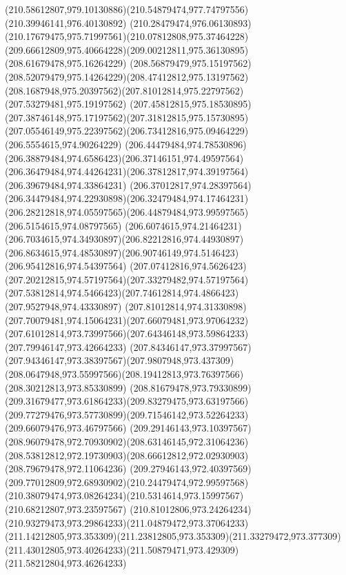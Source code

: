 {    \curveto(210.58612807,979.10130886)(210.54879474,977.74797556)(210.39946141,976.40130892)
    \curveto(210.28479474,976.06130893)(210.17679475,975.71997561)(210.07812808,975.37464228)
    \curveto(209.66612809,975.40664228)(209.00212811,975.36130895)(208.61679478,975.16264229)
    \curveto(208.56879479,975.15197562)(208.52079479,975.14264229)(208.47412812,975.13197562)
    \curveto(208.1687948,975.20397562)(207.81012814,975.22797562)(207.53279481,975.19197562)
    \curveto(207.45812815,975.18530895)(207.38746148,975.17197562)(207.31812815,975.15730895)
    \curveto(207.05546149,975.22397562)(206.73412816,975.09464229)(206.5554615,974.90264229)
    \curveto(206.44479484,974.78530896)(206.38879484,974.6586423)(206.37146151,974.49597564)
    \curveto(206.36479484,974.44264231)(206.37812817,974.39197564)(206.39679484,974.33864231)
    \curveto(206.37012817,974.28397564)(206.34479484,974.22930898)(206.32479484,974.17464231)
    \curveto(206.28212818,974.05597565)(206.44879484,973.99597565)(206.5154615,974.08797565)
    \curveto(206.6074615,974.21464231)(206.7034615,974.34930897)(206.82212816,974.44930897)
    \curveto(206.8634615,974.48530897)(206.90746149,974.5146423)(206.95412816,974.54397564)
    \curveto(207.07412816,974.5626423)(207.20212815,974.57197564)(207.33279482,974.57197564)
    \curveto(207.53812814,974.5466423)(207.74612814,974.4866423)(207.9527948,974.43330897)
    \curveto(207.81012814,974.31330898)(207.70079481,974.15064231)(207.66079481,973.97064232)
    \curveto(207.61012814,973.73997566)(207.64346148,973.59864233)(207.79946147,973.42664233)
    \curveto(207.84346147,973.37997567)(207.94346147,973.38397567)(207.9807948,973.437309)
    \curveto(208.0647948,973.55997566)(208.19412813,973.76397566)(208.30212813,973.85330899)
    \curveto(208.81679478,973.79330899)(209.31679477,973.61864233)(209.83279475,973.63197566)
    \curveto(209.77279476,973.57730899)(209.71546142,973.52264233)(209.66079476,973.46797566)
    \curveto(209.29146143,973.10397567)(208.96079478,972.70930902)(208.63146145,972.31064236)
    \curveto(208.53812812,972.19730903)(208.66612812,972.02930903)(208.79679478,972.11064236)
    \curveto(209.27946143,972.40397569)(209.77012809,972.68930902)(210.24479474,972.99597568)
    \curveto(210.38079474,973.08264234)(210.5314614,973.15997567)(210.68212807,973.23597567)
    \curveto(210.81012806,973.24264234)(210.93279473,973.29864233)(211.04879472,973.37064233)
    \curveto(211.14212805,973.353309)(211.23812805,973.353309)(211.33279472,973.377309)
    \curveto(211.43012805,973.40264233)(211.50879471,973.429309)(211.58212804,973.46264233)
}
